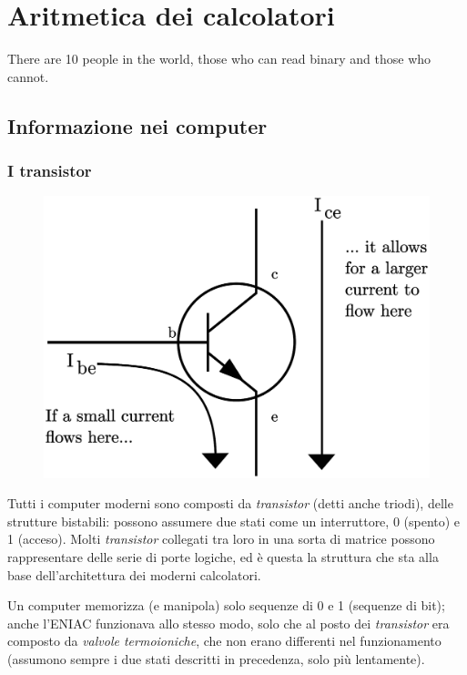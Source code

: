 \documentclass[class=book, crop=false, oneside]{standalone}
\begin{document}
\chapter{Aritmetica dei calcolatori}\begin{fquote}[Anonymous]There are 10 people in the world, those who can read binary and those who cannot.
 \end{fquote}

\section{Informazione nei computer}

\subsection{I transistor}

\begin{figure}
	\includegraphics[width=\linewidth]{transistor.eps}
	\label{fig:transistor}
	\centering
\end{figure}

Tutti i computer moderni sono composti da \emph{transistor} (detti anche triodi), delle strutture bistabili: possono assumere due stati come un interruttore, 0 (spento) e 1 (acceso). Molti \emph{transistor} collegati tra loro in una sorta di matrice possono rappresentare delle serie di porte logiche, ed è questa la struttura che sta alla base dell'architettura dei moderni calcolatori.

Un computer memorizza (e manipola) solo sequenze di 0 e 1 (sequenze di bit); anche l’ENIAC funzionava allo stesso modo, solo che al posto dei \emph{transistor} era composto da \emph{valvole termoioniche}, che non erano differenti nel funzionamento (assumono sempre i due stati descritti in precedenza, solo più lentamente).
\end{document}
